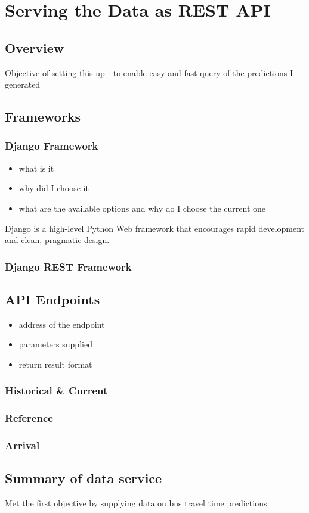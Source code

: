 \chapter{Serving the Data as REST API}

\section{Overview}
Objective of setting this up - to enable easy and fast query of the predictions I generated

\section{Frameworks}

\subsection{Django Framework}

\begin{itemize}
  \item what is it
  \item why did I choose it
  \item what are the available options and why do I choose the current one
\end{itemize}

\par Django is a high-level Python Web framework that encourages rapid development and clean, pragmatic design\cite{django_framework}.

\subsection{Django REST Framework}

\section{API Endpoints}
\begin{itemize}
  \item address of the endpoint
  \item parameters supplied
  \item return result format
\end{itemize}


\subsection{Historical \& Current}
\subsection{Reference}
\subsection{Arrival}



\section{Summary of data service}
Met the first objective by supplying data on bus travel time predictions
